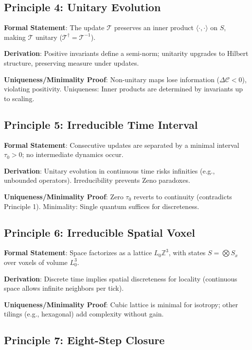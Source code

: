 \documentclass[twocolumn,prd,amsmath,amssymb,aps,superscriptaddress,nofootinbib]{revtex4-2}
\begin{document}
\subsection{Principle 4: Unitary Evolution}
\label{subsec:principle-4}

\textbf{Formal Statement}: The update $\mathcal{T}$ preserves an inner product $\langle \cdot, \cdot \rangle$ on $S$, making $\mathcal{T}$ unitary ($\mathcal{T}^\dagger = \mathcal{T}^{-1}$).

\textbf{Derivation}: Positive invariants define a semi-norm; unitarity upgrades to Hilbert structure, preserving measure under updates.

\textbf{Uniqueness/Minimality Proof}: Non-unitary maps lose information ($\Delta \mathcal{C} < 0$), violating positivity. Uniqueness: Inner products are determined by invariants up to scaling.

\subsection{Principle 5: Irreducible Time Interval}
\label{subsec:principle-5}

\textbf{Formal Statement}: Consecutive updates are separated by a minimal interval $\tau_0 > 0$; no intermediate dynamics occur.

\textbf{Derivation}: Unitary evolution in continuous time risks infinities (e.g., unbounded operators). Irreducibility prevents Zeno paradoxes.

\textbf{Uniqueness/Minimality Proof}: Zero $\tau_0$ reverts to continuity (contradicts Principle 1). Minimality: Single quantum suffices for discreteness.

\subsection{Principle 6: Irreducible Spatial Voxel}
\label{subsec:principle-6}

\textbf{Formal Statement}: Space factorizes as a lattice $L_0 \mathbb{Z}^3$, with states $S = \bigotimes S_x$ over voxels of volume $L_0^3$.

\textbf{Derivation}: Discrete time implies spatial discreteness for locality (continuous space allows infinite neighbors per tick).

\textbf{Uniqueness/Minimality Proof}: Cubic lattice is minimal for isotropy; other tilings (e.g., hexagonal) add complexity without gain.

\subsection{Principle 7: Eight-Step Closure}
\label{subsec:principle-7}
\end{document}
